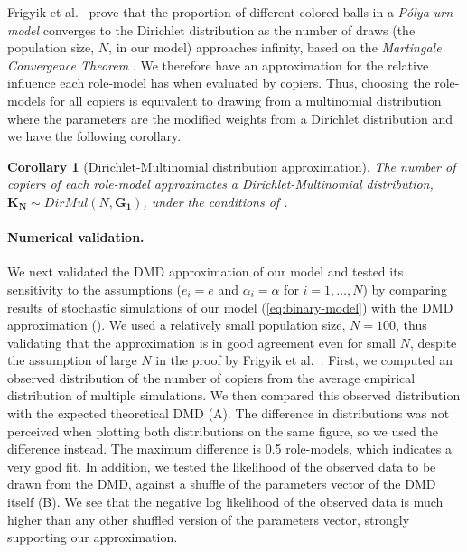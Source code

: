 \documentclass[12pt]{extarticle}
\let\vec\mathbf
\newtheorem{corollary}{Corollary}
\begin{document}
Frigyik et al.~\citep[section 2]{dirichlet} prove that the proportion of different colored balls in a \emph{P\'{o}lya urn model} converges to the Dirichlet distribution as the number of draws  (the population size, $N$, in our model) approaches infinity, based on the \emph{Martingale Convergence Theorem} \citep{martingaleBook}.
We therefore have an approximation for the relative influence each role-model has when evaluated by copiers. Thus, choosing the role-models for all copiers is equivalent to drawing from a {multinomial} distribution where the parameters are the modified weights from a Dirichlet distribution and we have the following corollary.
\\

\begin{corollary}[Dirichlet-Multinomial distribution approximation]\label{cor:dirichlet}
The number of copiers of each role-model approximates a Dirichlet-Multinomial distribution, $\vec{K_N} \sim \textit{DirMul}(N,\vec{G_1})$, under the conditions of .
\end{corollary}

\paragraph{Numerical validation.}
We next validated the DMD approximation of our model
and tested its sensitivity to the assumptions ($e_i=e$ and $\alpha_i=\alpha$ for $i=1,\ldots,N$) by comparing results of stochastic simulations of our model (\cref{eq:binary-model}) with the DMD approximation ().
We used a relatively small population size, $N=100$, thus validating that the approximation is in good agreement even for small $N$, despite the assumption of large $N$ in the proof by Frigyik et al.~\citep[section 2]{dirichlet}.
First, we computed an observed distribution of the number of copiers from the average empirical distribution of multiple simulations.
We then compared this observed distribution with the expected theoretical DMD (A).
The difference in distributions was not perceived when plotting both distributions on the same figure, so we used the difference instead.
The maximum difference is 0.5 role-models, which indicates a very good fit.
In addition, we tested the likelihood of the observed data to be drawn from the DMD, against a shuffle of the parameters vector of the DMD itself (B). We see that the negative log likelihood of the observed data is much higher than any other shuffled version of the parameters vector, strongly supporting our approximation.
\end{document}
